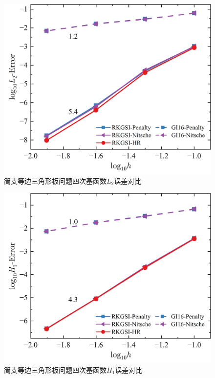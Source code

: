\begin{figure}[H]
    \centering
    \includegraphics[scale=0.5]{figure/PHR/T/QL2.png}
    \caption{简支等边三角形板问题四次基函数$L_2$误差对比}
\end{figure}
\newpage
\begin{figure}[H]
    \centering
    \includegraphics[scale=0.5]{figure/PHR/T/QH1.png}
    \caption{简支等边三角形板问题四次基函数$H_1$误差对比}
\end{figure}
